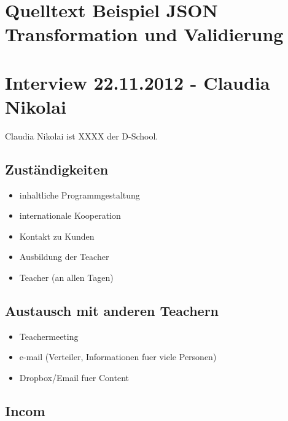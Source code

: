 \label{app:anhang}

\section{Quelltext Beispiel JSON Transformation und Validierung}



\section{Interview 22.11.2012 - Claudia Nikolai }
\label{sec:interview_nikolai}
Claudia Nikolai ist XXXX der D-School.

\subsection*{Zuständigkeiten}
\label{zustaendigkeiten}

\begin{itemize}
\item inhaltliche Programmgestaltung
\item internationale Kooperation
\item Kontakt zu Kunden
\item Ausbildung der Teacher
\item Teacher (an allen Tagen)
\end{itemize}

\subsection*{Austausch mit anderen Teachern}
\label{austauschmitanderenteachern}

\begin{itemize}
\item Teachermeeting
\item e-mail (Verteiler, Informationen fuer viele Personen)
\item Dropbox\slash Email fuer Content
\end{itemize}

\subsection*{Incom}
\label{incom}

